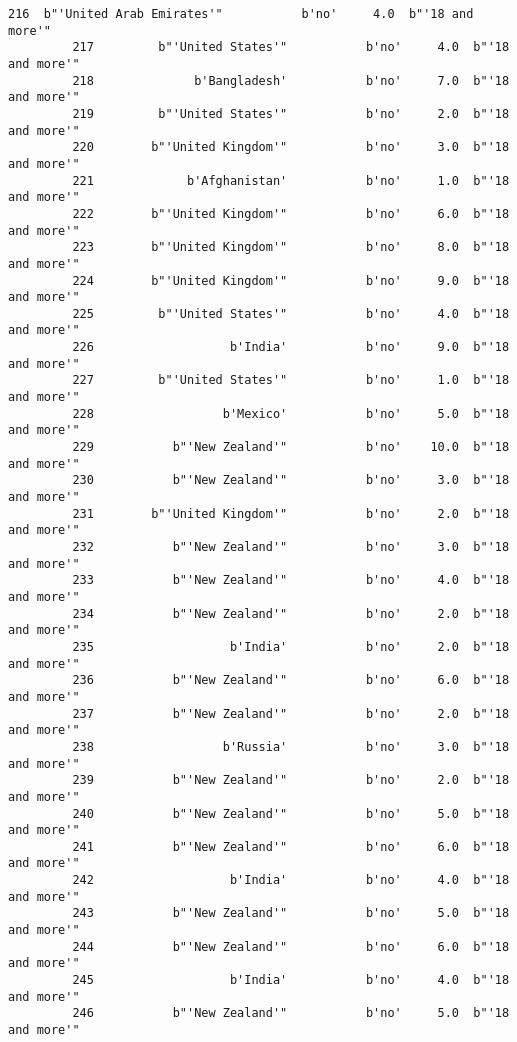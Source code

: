\documentclass[11pt]{article}
\begin{document}
\begin{Verbatim}[commandchars=\\\{\}]
         216  b"'United Arab Emirates'"           b'no'     4.0  b"'18 and more'"   
         217         b"'United States'"           b'no'     4.0  b"'18 and more'"   
         218              b'Bangladesh'           b'no'     7.0  b"'18 and more'"   
         219         b"'United States'"           b'no'     2.0  b"'18 and more'"   
         220        b"'United Kingdom'"           b'no'     3.0  b"'18 and more'"   
         221             b'Afghanistan'           b'no'     1.0  b"'18 and more'"   
         222        b"'United Kingdom'"           b'no'     6.0  b"'18 and more'"   
         223        b"'United Kingdom'"           b'no'     8.0  b"'18 and more'"   
         224        b"'United Kingdom'"           b'no'     9.0  b"'18 and more'"   
         225         b"'United States'"           b'no'     4.0  b"'18 and more'"   
         226                   b'India'           b'no'     9.0  b"'18 and more'"   
         227         b"'United States'"           b'no'     1.0  b"'18 and more'"   
         228                  b'Mexico'           b'no'     5.0  b"'18 and more'"   
         229           b"'New Zealand'"           b'no'    10.0  b"'18 and more'"   
         230           b"'New Zealand'"           b'no'     3.0  b"'18 and more'"   
         231        b"'United Kingdom'"           b'no'     2.0  b"'18 and more'"   
         232           b"'New Zealand'"           b'no'     3.0  b"'18 and more'"   
         233           b"'New Zealand'"           b'no'     4.0  b"'18 and more'"   
         234           b"'New Zealand'"           b'no'     2.0  b"'18 and more'"   
         235                   b'India'           b'no'     2.0  b"'18 and more'"   
         236           b"'New Zealand'"           b'no'     6.0  b"'18 and more'"   
         237           b"'New Zealand'"           b'no'     2.0  b"'18 and more'"   
         238                  b'Russia'           b'no'     3.0  b"'18 and more'"   
         239           b"'New Zealand'"           b'no'     2.0  b"'18 and more'"   
         240           b"'New Zealand'"           b'no'     5.0  b"'18 and more'"   
         241           b"'New Zealand'"           b'no'     6.0  b"'18 and more'"   
         242                   b'India'           b'no'     4.0  b"'18 and more'"   
         243           b"'New Zealand'"           b'no'     5.0  b"'18 and more'"   
         244           b"'New Zealand'"           b'no'     6.0  b"'18 and more'"   
         245                   b'India'           b'no'     4.0  b"'18 and more'"   
         246           b"'New Zealand'"           b'no'     5.0  b"'18 and more'"   

\end{Verbatim}
\end{document}
